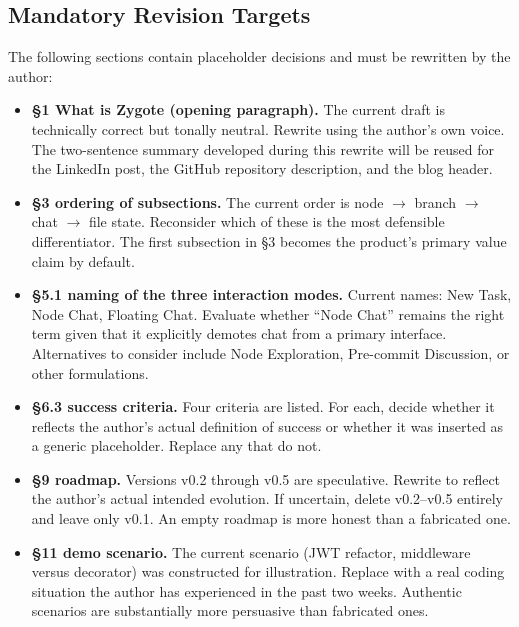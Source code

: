 \documentclass[11pt,letterpaper]{article}
\begin{document}
\subsection*{Mandatory Revision Targets}

The following sections contain placeholder decisions and must be rewritten by the author:

\begin{itemize}
  \item \textbf{§1 What is Zygote (opening paragraph).} The current draft is technically correct but tonally neutral. Rewrite using the author's own voice. The two-sentence summary developed during this rewrite will be reused for the LinkedIn post, the GitHub repository description, and the blog header.

  \item \textbf{§3 ordering of subsections.} The current order is node $\to$ branch $\to$ chat $\to$ file state. Reconsider which of these is the most defensible differentiator. The first subsection in §3 becomes the product's primary value claim by default.

  \item \textbf{§5.1 naming of the three interaction modes.} Current names: New Task, Node Chat, Floating Chat. Evaluate whether ``Node Chat'' remains the right term given that it explicitly demotes chat from a primary interface. Alternatives to consider include Node Exploration, Pre-commit Discussion, or other formulations.

  \item \textbf{§6.3 success criteria.} Four criteria are listed. For each, decide whether it reflects the author's actual definition of success or whether it was inserted as a generic placeholder. Replace any that do not.

  \item \textbf{§9 roadmap.} Versions v0.2 through v0.5 are speculative. Rewrite to reflect the author's actual intended evolution. If uncertain, delete v0.2--v0.5 entirely and leave only v0.1. An empty roadmap is more honest than a fabricated one.

  \item \textbf{§11 demo scenario.} The current scenario (JWT refactor, middleware versus decorator) was constructed for illustration. Replace with a real coding situation the author has experienced in the past two weeks. Authentic scenarios are substantially more persuasive than fabricated ones.
\end{itemize}
\end{document}
